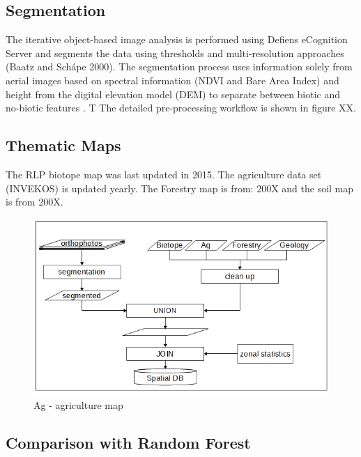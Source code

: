 \documentclass[authoryear, review,12pt,number]{elsarticle}
\begin{document}
\subsection{Segmentation}
The iterative object-based image analysis is performed using Defiens eCognition
Server and segments the data using thresholds and multi-resolution approaches
(Baatz and Sch\'ape 2000). The segmentation process uses information solely
from aerial images based on spectral information (NDVI and Bare Area Index) and
height from the digital elevation model (DEM) to separate
between biotic and no-biotic features \citep{Tintrup2015}. T 
The detailed pre-processing workflow is shown in figure XX.
\subsection{Thematic Maps}
The RLP biotope map was last updated in 2015. The agriculture data set
(INVEKOS) is updated yearly. The Forestry map is from: 200X and the soil map is
from 200X.

\begin{figure}
	\includegraphics[width=1\textwidth]{diagrams/pre_processing.png}
	\caption{Ag - agriculture map}
\end{figure}

\subsection{Comparison with Random Forest}
\end{document}

